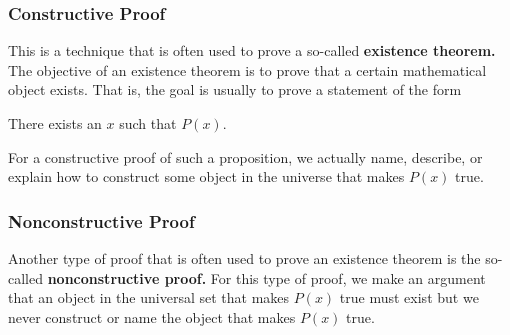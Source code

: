 \subsubsection*{Constructive Proof} 
%
%
This is a technique that is often used to prove a so-called \textbf{existence theorem.}
%
  The objective of an existence theorem is to prove that a certain mathematical object exists.  That is, the goal is usually to prove a statement of the form  
\begin{center}
There exists an $x$  such that  $P( x )$.
\end{center}
For a constructive proof of such a proposition, we actually name, describe, or explain how to construct  some object in the universe that makes  $P( x )$ true.

\subsubsection*{Nonconstructive Proof}
Another type of proof that is often used to prove an existence theorem is the so-called \textbf{nonconstructive proof.}
%
  For this type of proof, we make an argument that an object  in the universal set that makes  
$P\left( x \right)$ true must exist but we never construct or name the object that makes  
$P\left( x \right)$  true.

\endinput

